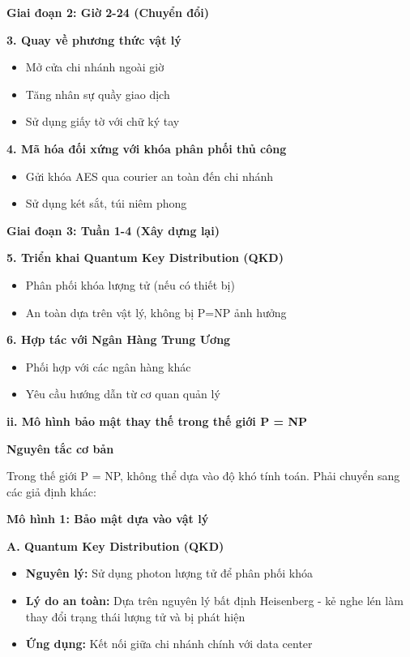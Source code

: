 \textbf{Giai đoạn 2: Giờ 2-24 (Chuyển đổi)}

\textbf{3. Quay về phương thức vật lý}
\begin{itemize}
    \item Mở cửa chi nhánh ngoài giờ
    \item Tăng nhân sự quầy giao dịch
    \item Sử dụng giấy tờ với chữ ký tay
\end{itemize}

\textbf{4. Mã hóa đối xứng với khóa phân phối thủ công}
\begin{itemize}
    \item Gửi khóa AES qua courier an toàn đến chi nhánh
    \item Sử dụng két sắt, túi niêm phong
\end{itemize}

\textbf{Giai đoạn 3: Tuần 1-4 (Xây dựng lại)}

\textbf{5. Triển khai Quantum Key Distribution (QKD)}
\begin{itemize}
    \item Phân phối khóa lượng tử (nếu có thiết bị)
    \item An toàn dựa trên vật lý, không bị P=NP ảnh hưởng
\end{itemize}

\textbf{6. Hợp tác với Ngân Hàng Trung Ương}
\begin{itemize}
    \item Phối hợp với các ngân hàng khác
    \item Yêu cầu hướng dẫn từ cơ quan quản lý
\end{itemize}

\vspace{0.2cm}

\textbf{ii. Mô hình bảo mật thay thế trong thế giới P = NP}

\textbf{Nguyên tắc cơ bản}

Trong thế giới P = NP, không thể dựa vào độ khó tính toán. Phải chuyển sang các giả định khác:

\textbf{Mô hình 1: Bảo mật dựa vào vật lý}

\textbf{A. Quantum Key Distribution (QKD)}
\begin{itemize}
    \item \textbf{Nguyên lý:} Sử dụng photon lượng tử để phân phối khóa
    \item \textbf{Lý do an toàn:} Dựa trên nguyên lý bất định Heisenberg - kẻ nghe lén làm thay đổi trạng thái lượng tử và bị phát hiện
    \item \textbf{Ứng dụng:} Kết nối giữa chi nhánh chính với data center
\end{itemize}

